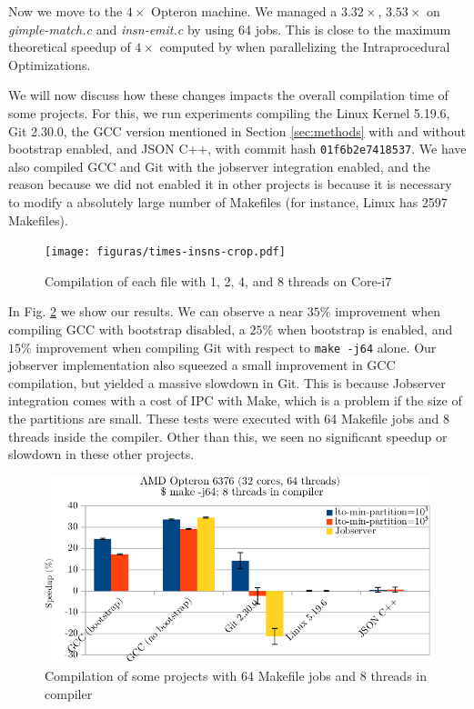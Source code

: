 \documentclass[runningheads]{llncs}
\begin{document}
Now we move to the $4\times$ Opteron machine. We managed a
$3.32\times$, $3.53\times$ on \textit{gimple-match.c} and
\textit{insn-emit.c} by using 64 jobs. This is close to the
maximum theoretical speedup of $4\times$ computed by
\cite{bernardino2020improving} when parallelizing the
Intraprocedural Optimizations.

We will now discuss how these changes impacts the overall compilation
time of some projects. For this, we run experiments compiling
the Linux Kernel 5.19.6, Git 2.30.0, the GCC version mentioned in
Section \ref{sec:methods} with and without bootstrap enabled, and JSON C++, with
commit hash \texttt{01f6b2e7418537}. We have also compiled GCC and
Git with the jobserver integration enabled, and the reason because
we did not enabled it in other projects is because it is necessary
to modify a absolutely large number of Makefiles (for instance, Linux
has 2597 Makefiles). 

\begin{figure}
\centering
	 \texttt{[image: figuras/times-insns-crop.pdf]}
	  \caption{Compilation of each file with 1, 2, 4, and 8 threads on
	  Core-i7}
	  \label{fig:gcc_all_files}
\end{figure}

In Fig. \ref{fig:gcc_projects} we show our results. We can observe
a near $35\%$ improvement when compiling GCC with bootstrap disabled,
a $25\%$ when bootstrap is enabled, and $15\%$
improvement when compiling Git with respect to
\texttt{make -j64} alone. Our jobserver implementation also
squeezed a small improvement in GCC compilation, but yielded a massive
slowdown in Git. This is because Jobserver integration comes with
a cost of IPC with Make, which is a problem if the size of the partitions
are small.  These tests were executed with 64 Makefile
jobs and 8 threads inside the compiler. Other than this, we seen
no significant speedup or slowdown in these other projects.

\begin{figure}
\centering
	 \includegraphics[scale=0.8]{figuras/experiment_projects_new-crop.pdf}
	  \caption{Compilation of some projects with 64 Makefile jobs and 8 threads in compiler}
	  \label{fig:gcc_projects}
\end{figure}
\end{document}
